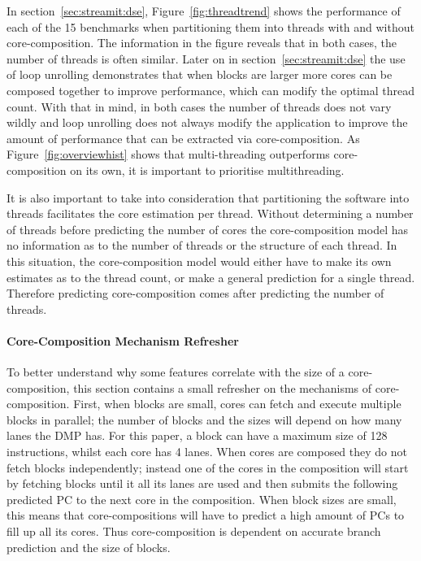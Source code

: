 In section~\ref{sec:streamit:dse}, Figure~\ref{fig:threadtrend} shows the performance of each of the 15 benchmarks when partitioning them into threads with and without core-composition.
The information in the figure reveals that in both cases, the number of threads is often similar.
Later on in section~\ref{sec:streamit:dse} the use of loop unrolling demonstrates that when blocks are larger more cores can be composed together to improve performance, which can modify the optimal thread count.
With that in mind, in both cases the number of threads does not vary wildly and loop unrolling does not always modify the application to improve the amount of performance that can be extracted via core-composition.
As Figure~\ref{fig:overviewhist} shows that multi-threading outperforms core-composition on its own, it is important to prioritise multithreading.

It is also important to take into consideration that partitioning the software into threads facilitates the core estimation per thread.
Without determining a number of threads before predicting the number of cores the core-composition model has no information as to the number of threads or the structure of each thread.
In this situation, the core-composition model would either have to make its own estimates as to the thread count, or make a general prediction for a single thread.
Therefore predicting core-composition comes after predicting the number of threads.

\paragraph{Core-Composition Mechanism Refresher}
To better understand why some features correlate with the size of a core-composition, this section contains a small refresher on the mechanisms of core-composition.
First, when blocks are small, cores can fetch and execute multiple blocks in parallel; the number of blocks and the sizes will depend on how many lanes the DMP has.
For this paper, a block can have a maximum size of 128 instructions, whilst each core has 4 lanes.
When cores are composed they do not fetch blocks independently; instead one of the cores in the composition will start by fetching blocks until it all its lanes are used and then submits the following predicted PC to the next core in the composition.
When block sizes are small, this means that core-compositions will have to predict a high amount of PCs to fill up all its cores.
Thus core-composition is dependent on accurate branch prediction and the size of blocks.


